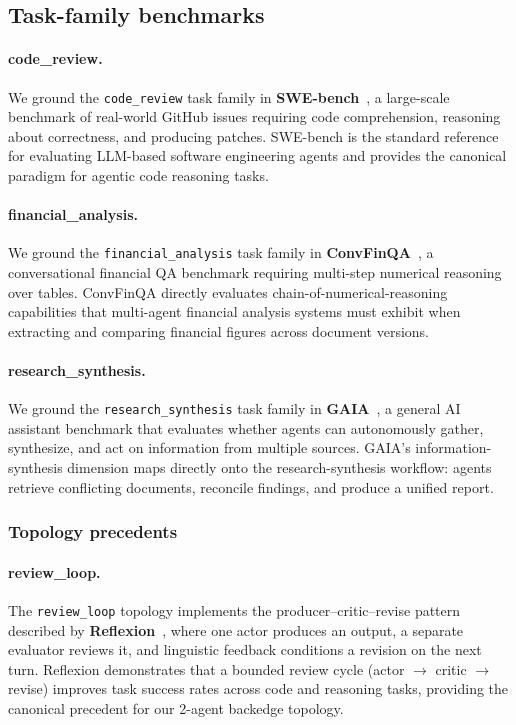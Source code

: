 \subsection{Task-family benchmarks}

\paragraph{code\_review.}
We ground the \texttt{code\_review} task family in
\textbf{SWE-bench}~\citep{jimenez2023swebench}, a large-scale benchmark of
real-world GitHub issues requiring code comprehension, reasoning about
correctness, and producing patches. SWE-bench is the standard reference for
evaluating LLM-based software engineering agents and provides the canonical
paradigm for agentic code reasoning tasks.

\paragraph{financial\_analysis.}
We ground the \texttt{financial\_analysis} task family in
\textbf{ConvFinQA}~\citep{chen2022convfinqa}, a conversational financial QA
benchmark requiring multi-step numerical reasoning over tables. ConvFinQA
directly evaluates chain-of-numerical-reasoning capabilities that
multi-agent financial analysis systems must exhibit when extracting and
comparing financial figures across document versions.

\paragraph{research\_synthesis.}
We ground the \texttt{research\_synthesis} task family in
\textbf{GAIA}~\citep{mialon2023gaia}, a general AI assistant benchmark that
evaluates whether agents can autonomously gather, synthesize, and act on
information from multiple sources. GAIA's information-synthesis dimension
maps directly onto the research-synthesis workflow: agents retrieve
conflicting documents, reconcile findings, and produce a unified report.

\subsubsection{Topology precedents}

\paragraph{review\_loop.}
The \texttt{review\_loop} topology implements the producer--critic--revise
pattern described by \textbf{Reflexion}~\citep{shinn2023reflexion}, where
one actor produces an output, a separate evaluator reviews it, and
linguistic feedback conditions a revision on the next turn. Reflexion
demonstrates that a bounded review cycle (actor $\to$ critic $\to$ revise)
improves task success rates across code and reasoning tasks, providing the
canonical precedent for our 2-agent backedge topology.

